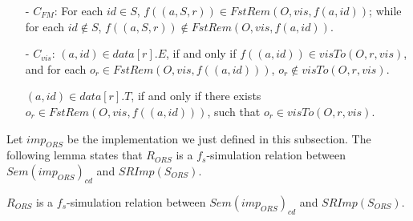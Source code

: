 \begin{itemize}
\item[-] $C_{\mathit{FM}}$: For each $\mathit{id} \in S$, $f((a,S,r)) \in \mathit{FstRem}(O,\mathit{vis},f(a,\mathit{id}))$; while for each $\mathit{id} \notin S$, $f((a,S,r)) \notin \mathit{FstRem}(O,\mathit{vis},f(a,\mathit{id}))$.

\item[-] $C_{\mathit{vis}}$: $(a,\mathit{id}) \in data[r].E$, if and only if $f((a,\mathit{id})) \in \mathit{visTo}(O,r,\mathit{vis})$, and for each $o_r \in \mathit{FstRem}(O,\mathit{vis},f((a,\mathit{id})))$, $o_r \notin \mathit{visTo}(O,r,\mathit{vis})$.

    $(a,\mathit{id}) \in data[r].T$, if and only if there exists $o_r \in \mathit{FstRem}(O,\mathit{vis},f((a,\mathit{id})))$, such that $o_r \in \mathit{visTo}(O,r,\mathit{vis})$.
\end{itemize}

Let $\mathit{imp}_{\mathit{ORS}}$ be the implementation we just defined in this subsection. The following lemma states that $R_{\mathit{ORS}}$ is a $f_s$-simulation relation between $\mathit{Sem}( \mathit{imp}_{\mathit{ORS}} )_{\mathit{cd}}$ and $\mathit{SRImp}(S_{\mathit{ORS}})$.


\begin{lemma}
\label{lemma:ROrscd is a fs simulation between orset causal delivery algorithm and orset specification}
$R_{\mathit{ORS}}$ is a $f_s$-simulation relation between $\mathit{Sem}( \mathit{imp}_{\mathit{ORS}} )_{\mathit{cd}}$ and $\mathit{SRImp}(S_{\mathit{ORS}})$.
\end{lemma}


